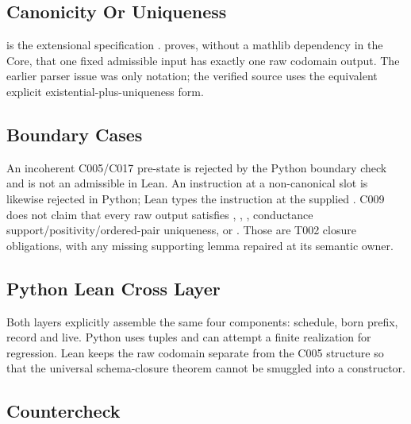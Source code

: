 \subsection{Canonicity Or Uniqueness}\label{canonicity-or-uniqueness-13}

\texttt{\protect{}} is the extensional
specification \texttt{\protect{}}.
\texttt{\protect{}} proves, without a mathlib
dependency in the Core, that one fixed admissible input has exactly one
raw codomain output. The earlier \texttt{\protect{}} parser issue was only
notation; the verified source uses the equivalent explicit
existential-plus-uniqueness form.

\subsection{Boundary Cases}\label{boundary-cases-13}

An incoherent C005/C017 pre-state is rejected by the Python boundary
check and is not an admissible \texttt{\protect{}} in Lean.
An instruction at a non-canonical slot is likewise rejected in Python;
Lean types the instruction at the supplied \texttt{\protect{}}. C009
does not claim that every raw output satisfies
\texttt{\protect{}}, \texttt{\protect{}}, \texttt{\protect{}},
conductance support/positivity/ordered-pair uniqueness, or
\texttt{\protect{}}. Those are T002 closure obligations, with any
missing supporting lemma repaired at its semantic owner.

\subsection{Python Lean Cross Layer}\label{python-lean-cross-layer-13}

Both layers explicitly assemble the same four components: schedule, born
prefix, record and live. Python uses tuples and can attempt a finite
\texttt{\protect{}} realization for regression. Lean keeps the
raw codomain separate from the C005 structure so that the universal
schema-closure theorem cannot be smuggled into a constructor.

\subsection{Countercheck}\label{countercheck-13}

